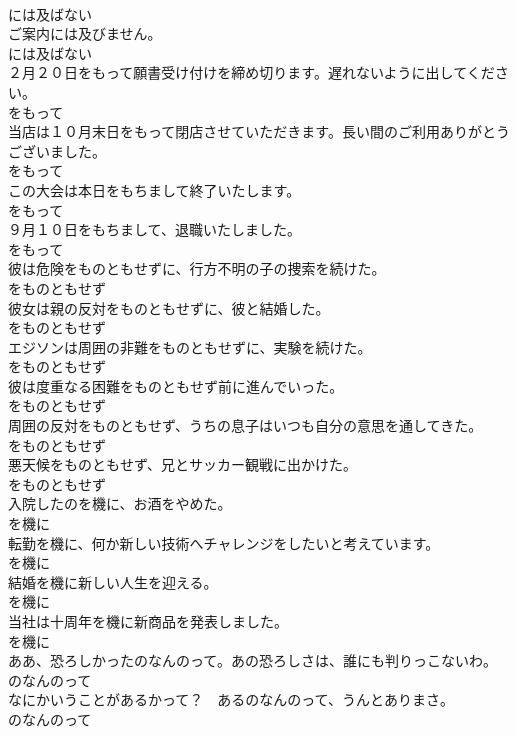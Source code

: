 \documentclass[8pt]{extreport}
\begin{document}
\begin{CJK}{UTF8}{min}
\\	には及ばない
\\	ご案内には及びません。	
\\	には及ばない
\\	２月２０日をもって願書受け付けを締め切ります。遅れないように出してください。	
\\	をもって
\\	当店は１０月末日をもって閉店させていただきます。長い間のご利用ありがとうございました。	
\\	をもって
\\	この大会は本日をもちまして終了いたします。	
\\	をもって
\\	９月１０日をもちまして、退職いたしました。	
\\	をもって
\\	彼は危険をものともせずに、行方不明の子の捜索を続けた。	
\\	をものともせず
\\	彼女は親の反対をものともせずに、彼と結婚した。	
\\	をものともせず
\\	エジソンは周囲の非難をものともせずに、実験を続けた。	
\\	をものともせず
\\	彼は度重なる困難をものともせず前に進んでいった。	
\\	をものともせず
\\	周囲の反対をものともせず、うちの息子はいつも自分の意思を通してきた。	
\\	をものともせず
\\	悪天候をものともせず、兄とサッカー観戦に出かけた。	
\\	をものともせず
\\	入院したのを機に、お酒をやめた。	
\\	を機に
\\	転勤を機に、何か新しい技術へチャレンジをしたいと考えています。	
\\	を機に
\\	結婚を機に新しい人生を迎える。	
\\	を機に
\\	当社は十周年を機に新商品を発表しました。	
\\	を機に
\\	ああ、恐ろしかったのなんのって。あの恐ろしさは、誰にも判りっこないわ。	
\\	のなんのって
\\	なにかいうことがあるかって？　あるのなんのって、うんとありまさ。	
\\	のなんのって

\end{CJK}
\end{document}
